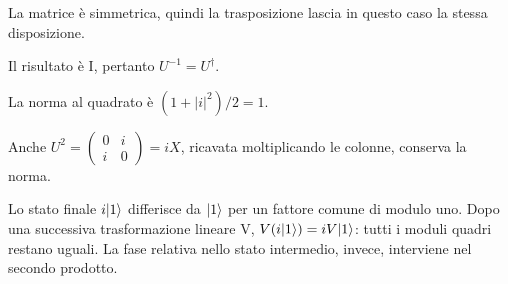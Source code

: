 La matrice è simmetrica, quindi la trasposizione lascia in questo caso la stessa disposizione.


Il risultato è I, pertanto \(U^{-1}=U^\dagger\).


La norma al quadrato è \((1+|i|^2)/2=1\).


Anche \(U^2=\begin{pmatrix}0&i\\i&0\end{pmatrix}=iX\), ricavata moltiplicando le colonne, conserva la norma.


Lo stato finale \(i\lvert 1\rangle\) differisce da \(\lvert 1\rangle\) per un fattore comune di modulo uno. Dopo una successiva trasformazione lineare V, \(V(i\lvert 1\rangle)=iV\lvert 1\rangle\): tutti i moduli quadri restano uguali. La fase relativa nello stato intermedio, invece, interviene nel secondo prodotto.

